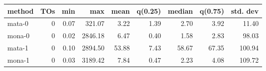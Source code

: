 \begin{tabular}{lrrrrrrrr}
\hline
 method   &   TOs &   min &     max &   mean &   q(0.25) &   median &   q(0.75) &   std. dev \\
\hline
 mata-0   &  0 &  0.07 &  321.07 &   3.22 &      1.39 &     2.70 &      3.92 &      11.40 \\
 mona-0   &  0 &  0.02 & 2846.18 &   6.47 &      0.40 &     1.58 &      2.83 &      98.03 \\
 mata-1   &  0 &  0.10 & 2894.50 &  53.88 &      7.43 &    58.67 &     67.35 &     100.94 \\
 mona-1   &  0 &  0.03 & 3189.42 &   7.84 &      0.47 &     2.23 &      4.08 &     109.72 \\
\hline
\end{tabular}
